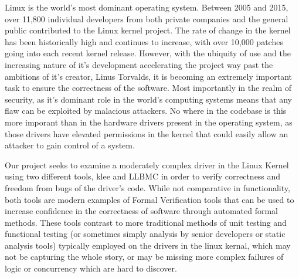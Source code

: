 Linux is the world’s most dominant operating system.
Between 2005 and 2015, over 11,800 individual developers from both private companies
and the general public contributed to the Linux kernel project.
The rate of change in the kernel has been historically high and continues to increase,
with over 10,000 patches going into each recent kernel release. \cite{linux}
However, with the ubiquity of use and the increasing nature of it's development
accelerating the project way past the ambitions of it's creator, Linus Torvalds,
it is becoming an extremely important task to ensure the correctness of the software.
Most importantly in the realm of security, as it's dominant role in the world's computing
systems means that any flaw can be exploited by malacious attackers.
No where in the codebase is this more imporant than in the hardware drivers present in
the operating system, as those drivers have elevated permissions in the kernel
that could easily allow an attacker to gain control of a system.
\par
Our project seeks to examine a moderately complex driver in the Linux Kernel 
using two different tools, klee \cite{klee} and LLBMC \cite{llbmc} in order to verify
correctness and freedom from bugs of the driver's code.
While not comparative in functionality, both tools are modern examples of Formal 
Verification tools that can be used to increase confidence in the correctness of software
through automated formal methods.
These tools contrast to more traditional methods of unit testing and functional testing
(or sometimes simply analysis by senior developers or static analysis tools)
typically employed on the drivers in the linux kernal, which may not be capturing the whole
story, or may be missing more complex failures of logic or concurrency which are hard to discover.
